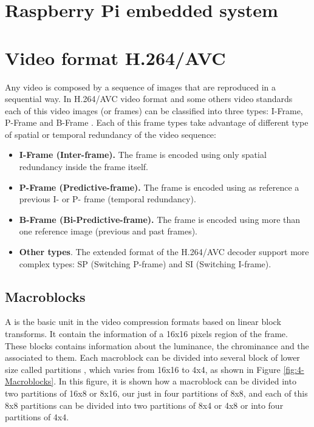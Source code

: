 \section{Raspberry Pi embedded system}





\section{Video format H.264/AVC}
\label{subsect:H.264}
Any video is composed by a sequence of images that are reproduced in a sequential way. In H.264/AVC video format and some others video standards each of this video images (or frames) can be classified into three types: I-Frame, P-Frame and B-Frame \cite{SC11}. Each of this frame types take advantage of different type of spatial or temporal redundancy of the video sequence: 
\begin{itemize}
	\item \textbf{I-Frame (Inter-frame).} The frame is encoded using only spatial redundancy inside the frame itself.
	\item \textbf{P-Frame (Predictive-frame).} The frame is encoded using as reference a previous I- or P- frame (temporal redundancy).
	\item \textbf{B-Frame (Bi-Predictive-frame).} The frame is encoded using more than one reference image (previous and past frames).
	\item \textbf{Other types}. The extended format of the H.264/AVC decoder support more complex types: SP (Switching P-frame) and SI (Switching I-frame).
\end{itemize}

\subsection{Macroblocks}
\label{subsect:Macroblocks}
A  is the basic unit in the video compression formats based on linear block transforms. It contain the information of a 16x16 pixels region of the frame. These blocks contains information about the luminance, the chrominance and the  associated to them. Each macroblock can be divided into several block of lower size called partitions \cite{Gir14}, which varies from 16x16 to 4x4, as shown in Figure \ref{fig:4-Macroblocks}. In this figure, it is shown how a macroblock can be divided into two partitions of 16x8 or 8x16, our just in four partitions of 8x8, and each of this 8x8 partitions can be divided into two partitions of 8x4 or 4x8 or into four partitions of 4x4.

